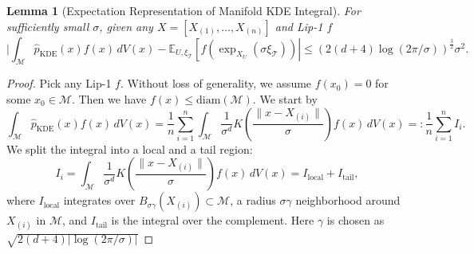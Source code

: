 \documentclass{article}
\newtheorem{lemma}[theorem]{Lemma}
\def\calM{\mathcal{M}}
\begin{document}
\begin{lemma}[Expectation Representation of Manifold KDE Integral]
\label{lem:KDEexp}
For sufficiently small \( \sigma \), given any $X=[X_{(1)},\ldots, X_{(n)}]$ and Lip-1 $f$
\[
|\int_{\mathcal{M}} \hat{p}_{\mathrm{KDE}}(x) f(x) \, dV(x) - \mathbb{E}_{U, \xi_{\mathcal{T}}}\left[ f\left( \exp_{X_U}(\sigma \xi_{\mathcal{T}}) \right) \right|\leq (2(d+4)\log (2\pi/\sigma))^{\frac{3}{2}}\sigma^2.
\]
\end{lemma}


\begin{proof}
Pick any Lip-1 $f$. Without loss of generality, we assume $f(x_0)=0$ for some $x_0\in \calM$. Then we have $f(x)\leq \text{diam}(\calM)$. We start by 
\[
\int_{\mathcal{M}} \hat{p}_{\text{KDE}}(x) f(x) \, dV(x) = \frac{1}{n} \sum_{i=1}^n \int_{\mathcal{M}} \frac{1}{\sigma^d} K\left( \frac{\|x-X_{(i)}\|}{\sigma} \right) f(x) \, dV(x) =: \frac{1}{n} \sum_{i=1}^n I_i.
\]
We split the integral into a local and a tail region:
\[
I_i = \int_{\mathcal{M}} \frac{1}{\sigma^d} K\left( \frac{\|x-X_{(i)}\|}{\sigma} \right) f(x) \, dV(x) = I_{\text{local}} + I_{\text{tail}},
\]
where \( I_{\text{local}} \) integrates over \( B_{\sigma \gamma}(X_{(i)}) \subset \mathcal{M} \), a radius $\sigma \gamma$ neighborhood around \(X_{(i)}\) in $\calM$, and \( I_{\text{tail
}} \) is the integral over the complement. Here $\gamma$ is chosen as $\sqrt{2(d+4)|\log (2\pi/\sigma)|}$


\end{proof}
\end{document}
